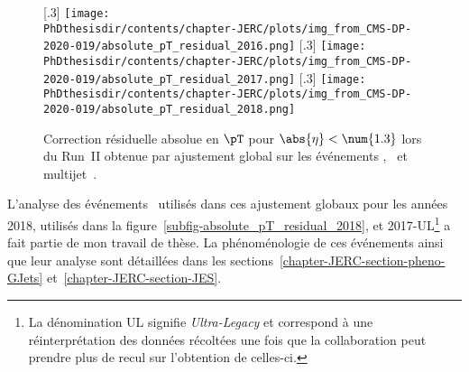 \begin{figure}[h]
\centering
{}[.3\textwidth]
{\texttt{[image: \\PhDthesisdir/contents/chapter-JERC/plots/img\_from\_CMS-DP-2020-019/absolute\_pT\_residual\_2016.png]}}
\hfill
{}[.3\textwidth]
{\texttt{[image: \\PhDthesisdir/contents/chapter-JERC/plots/img\_from\_CMS-DP-2020-019/absolute\_pT\_residual\_2017.png]}}
\hfill
{}[.3\textwidth]
{\texttt{[image: \\PhDthesisdir/contents/chapter-JERC/plots/img\_from\_CMS-DP-2020-019/absolute\_pT\_residual\_2018.png]}}
\caption[Correction résiduelle absolue en $\pT$ pour $\abs{\eta}<\num{1.3}$ lors du Run~II.]{Correction résiduelle absolue en $\pT$ pour $\abs{\eta}<\num{1.3}$ lors du Run~II obtenue par ajustement global sur les événements \Gjets, \Zjets\ et multijet~\cite{CMS-DP-2020-019}.}
\label{fig-L3ResAbs_RunII}
\end{figure}
\par L'analyse des événements \Gjets\ utilisés dans ces ajustement globaux pour les années 2018, utilisés dans la figure~\ref{subfig-absolute_pT_residual_2018}, et 2017-UL\footnote{La dénomination \og UL \fg{} signifie \emph{Ultra-Legacy} et correspond à une réinterprétation des données récoltées une fois que la collaboration peut prendre plus de recul sur l'obtention de celles-ci.} a fait partie de mon travail de thèse.
La phénoménologie de ces événements ainsi que leur analyse sont détaillées dans les sections~\ref{chapter-JERC-section-pheno-GJets} et~\ref{chapter-JERC-section-JES}.
\newpage
